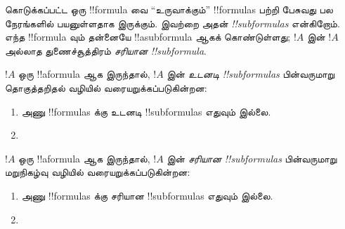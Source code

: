 \documentclass[../../../include/open-logic-section]{subfiles}
\begin{document}


\begin{explain}
கொடுக்கப்பட்ட ஒரு !!{formula} வை ``உருவாக்கும்'' !!{formula}s பற்றி பேசுவது
பல நேரங்களில் பயனுள்ளதாக இருக்கும். இவற்றை அதன்
\emph{!!{subformula}s} என்கிறோம். எந்த !!{formula} வும் தன்னையே !!a{subformula}
ஆகக் கொண்டுள்ளது; $!A$ இன் $!A$ அல்லாத துணைச்சூத்திரம்
\emph{சரியான !!{subformula}}.
\end{explain}

\begin{defn}
$!A$ ஒரு !!a{formula} ஆக இருந்தால், $!A$ இன்
\emph{உடனடி !!{subformula}s} பின்வருமாறு தொகுத்தறிதல் வழியில்
வரையறுக்கப்படுகின்றன:
\begin{enumerate}
\item அணு !!{formula}s க்கு உடனடி !!{subformula}s எதுவும் இல்லை.


\item {}


\end{enumerate}
\end{defn}

\begin{defn}[சரியான !!^{subformula}]
$!A$ ஒரு !!a{formula} ஆக இருந்தால், $!A$ இன்
\emph{சரியான !!{subformula}s} பின்வருமாறு மறுநிகழ்வு வழியில்
வரையறுக்கப்படுகின்றன:
\begin{enumerate}
\item அணு !!{formula}s க்கு சரியான !!{subformula}s எதுவும் இல்லை.


\item {}


\end{enumerate}
\end{defn}
\end{document}
